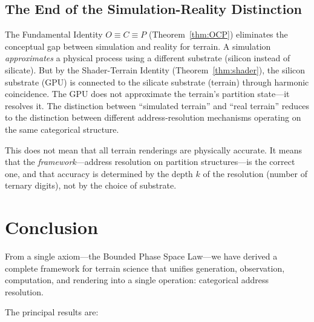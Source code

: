 \documentclass[10pt,twocolumn]{article}
\theoremstyle{definition}
\theoremstyle{remark}
\begin{document}
\subsection{The End of the Simulation-Reality Distinction}

The Fundamental Identity $O\equiv C\equiv P$
(Theorem~\ref{thm:OCP}) eliminates the conceptual gap between
simulation and reality for terrain.  A simulation
\emph{approximates} a physical process using a different
substrate (silicon instead of silicate).  But by the
Shader-Terrain Identity (Theorem~\ref{thm:shader}), the silicon
substrate (GPU) is connected to the silicate substrate (terrain)
through harmonic coincidence.  The GPU does not approximate the
terrain's partition state---it resolves it.  The distinction
between ``simulated terrain'' and ``real terrain'' reduces to the
distinction between different address-resolution mechanisms
operating on the same categorical structure.

This does not mean that all terrain renderings are physically
accurate.  It means that the \emph{framework}---address
resolution on partition structures---is the correct one, and
that accuracy is determined by the depth $k$ of the resolution
(number of ternary digits), not by the choice of substrate.

\section{Conclusion}\label{sec:conclusion}

From a single axiom---the Bounded Phase Space Law---we have
derived a complete framework for terrain science that unifies
generation, observation, computation, and rendering into a
single operation: categorical address resolution.

The principal results are:
\end{document}
